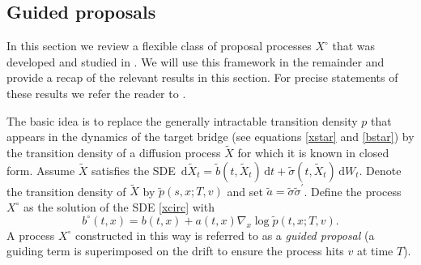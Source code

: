 \documentclass[preprint]{imsart}
\newcommand{\si}{\sigma}
\renewcommand{\tilde}{\widetilde}
\theoremstyle{definition}
\newcommand{\dd}{{\,\mathrm d}}
\newcommand{\T}{{\prime}}
\begin{document}

\subsection{Guided proposals}\label{sec:guided-proposals}
In this section we review a flexible class of proposal processes $X^\circ$ that was developed and studied in  \cite{Schauer}. We will use this framework in the remainder and provide a recap of the relevant results in this section. For precise statements of these results we refer the reader to \cite{Schauer}. 

The basic idea is to replace the generally intractable transition density $p$ that appears in the  dynamics of the target bridge (see equations \eqref{xstar} and \eqref{bstar}) by  the transition density of a diffusion process $\tilde{X}$  for which it is known in closed form. Assume $\tilde{X}$ satisfies the SDE $\dd \tilde{X}_t = \tilde{b}(t, \tilde{X}_t) \dd t + \tilde{\si}(t, \tilde{X}_t) \dd W_t$.  Denote the transition density of $\tilde{X}$ by $\tilde{p}(s,x; T,v)$ and set $\tilde{a}=\tilde{\si}\tilde{\si}^\T$. Define the process $X^\circ$ as the solution of the SDE \eqref{xcirc} with 
\begin{equation}\label{bcirc} \tag{$\circ\circ$}
			b^\circ(t, x) = b(t,x) + a(t, x) \nabla_x  \log  \tilde p(t,x;T,v).
\end{equation} 
A process $X^\circ$ constructed in this way is referred to as a {\it guided proposal} (a guiding term is superimposed on the drift to ensure the process hits $v$ at time $T$). 
\end{document}
